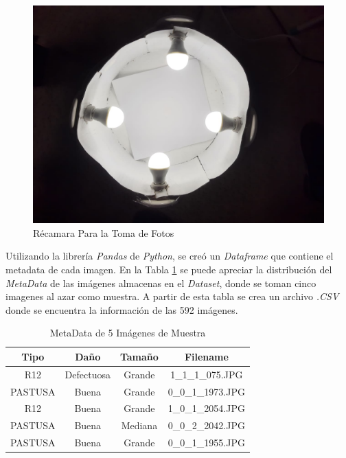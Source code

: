 \begin{figure}[ht]
	\centering
	\includegraphics[scale=0.15]{Figs/Chamber.JPEG}
	\caption{Récamara Para la Toma de Fotos}
	\label{fig:chamber}
\end{figure}

Utilizando la librería \textit{Pandas} de \textit{Python}, se creó un \textit{Dataframe} que contiene el metadata de cada imagen. En la Tabla \ref{table:metadata} se puede apreciar la distribución del \textit{MetaData} de las imágenes almacenas en el \textit{Dataset}, donde se toman cinco imagenes al azar como muestra. A partir de esta tabla se crea un archivo \textit{.CSV} donde se encuentra la información de las 592 imágenes.

\begin{table}[ht]
	\centering
	\begin{tabular}{|c|c|c|c|}
		\hline
		Tipo & Daño & Tamaño & Filename \\
		\hline
		R12 & Defectuosa & Grande & 1\_1\_1\_075.JPG \\
		\hline
		PASTUSA & Buena & Grande & 0\_0\_1\_1973.JPG \\
		\hline
		R12 & Buena & Grande & 1\_0\_1\_2054.JPG \\
		\hline
		PASTUSA & Buena & Mediana & 0\_0\_2\_2042.JPG \\
		\hline
		PASTUSA & Buena & Grande & 0\_0\_1\_1955.JPG \\
		\hline
	\end{tabular}	
	\caption{MetaData de 5 Imágenes de Muestra}
	\label{table:metadata}
\end{table}


